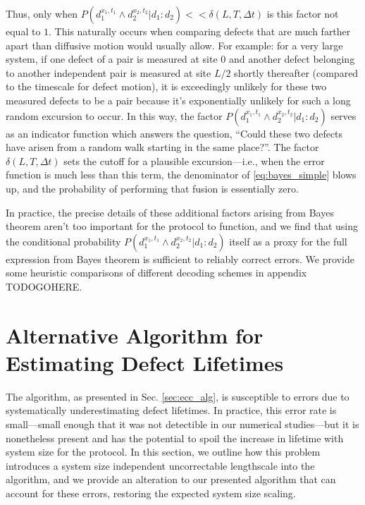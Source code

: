 \documentclass[twocolumn,superscriptaddress,aps,prb,floatfix]{revtex4-1}
\begin{document}
Thus, only when $P(d_1^{x_1,t_1} \wedge d_2^{x_2,t_2} | d_1:d_2) << \delta(L,T,\Delta t)$ is this factor not equal to $1$.  This naturally occurs when comparing defects that are much farther apart than diffusive motion would usually allow.  For example: for a very large system, if one defect of a pair is measured at site $0$ and another defect belonging to another independent pair is measured at site $L/2$ shortly thereafter (compared to the timescale for defect motion), it is exceedingly unlikely for these two measured defects to be a pair because it's exponentially unlikely for such a long random excursion to occur.  In this way, the factor $P(d_1^{x_1,t_1} \wedge d_2^{x_2,t_2} | d_1:d_2)$  serves as an indicator function which answers the question, ``Could these two defects have arisen from a random walk starting in the same place?''.  The factor $\delta(L,T,\Delta t)$ sets the cutoff for a plausible excursion---i.e., when the error function is much less than this term, the denominator of \ref{eq:bayes_simple} blows up, and the probability of performing that fusion is essentially zero.

In practice, the precise details of these additional factors arising from Bayes theorem aren't too important for the protocol to function, and we find that using the conditional probability $P(d_1^{x_1,t_1} \wedge d_2^{x_2,t_2} | d_1:d_2)$ itself as a proxy for the full expression from Bayes theorem is sufficient to reliably correct errors.  We provide some heuristic comparisons of different decoding schemes in appendix TODOGOHERE.


\appendix
\section{Alternative Algorithm for Estimating Defect Lifetimes}
\label{sec:appendix_fix_long_errors}

The algorithm, as presented in Sec. \ref{sec:ecc_alg}, is susceptible to errors due to systematically underestimating defect lifetimes.  In practice, this error rate is small---small enough that it was not detectible in our numerical studies---but it is nonetheless present and has the potential to spoil the increase in lifetime with system size for the protocol.  In this section, we outline how this problem introduces a system size independent uncorrectable lengthscale into the algorithm, and we provide an alteration to our presented algorithm that can account for these errors, restoring the expected system size scaling.
\end{document}
